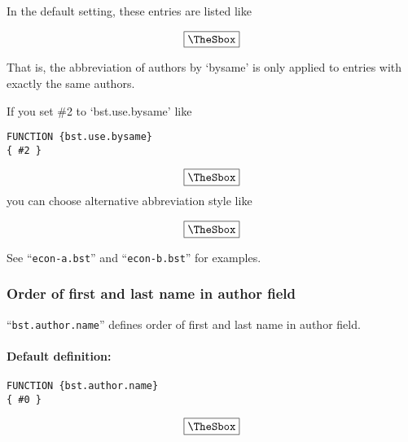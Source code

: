 \documentclass[10pt]{article}
\newenvironment{Frame}%
{\setlength{\fboxsep}{15pt}
\setlength{\mylength}{\linewidth}%
\addtolength{\mylength}{-2\fboxsep}%
\addtolength{\mylength}{-2\fboxrule}%
\Sbox
\minipage{\mylength}%
\setlength{\abovedisplayskip}{0pt}%
\setlength{\belowdisplayskip}{0pt}%
}%
{\endminipage\endSbox
\[\fbox{\TheSbox}\]}
\newcommand{\bysameline}{\hskip.3em \leavevmode\rule[.5ex]{3em}{.3pt}\hskip0.5em}
\begin{document}
In the default setting, these entries are listed like
\begin{Frame}
\end{Frame}

That is, the abbreviation of authors by `bysame' is only applied to
entries with exactly the same authors.

If you set \#2 to `bst.use.bysame' like
\begin{Frame}
\begin{verbatim}
FUNCTION {bst.use.bysame}
{ #2 }  
\end{verbatim}
\end{Frame}
you can choose alternative abbreviation style like
\begin{Frame}
\end{Frame}
\vspace*{1em}

See ``\texttt{econ-a.bst}'' and ``\texttt{econ-b.bst}'' for examples.


\subsubsection{Order of first and last name in author field}

``\texttt{bst.author.name}'' defines order of first and last name in author field.

\paragraph{Default definition:}
\begin{Frame}
\begin{verbatim}
FUNCTION {bst.author.name}
{ #0 }
\end{verbatim}
\end{Frame}
\end{document}
